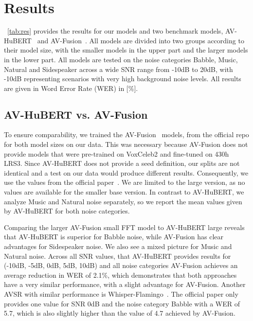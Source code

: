 \section{Results}



\tablename~\ref{tab:res} provides the results for our models and two benchmark models, AV-HuBERT~\cite{AVSR_robust_ssAVSR_avhubert2_2022} and AV-Fusion~\cite{AVSR_2023_selfsupervised}. All models are divided into two groups according to their model size, with the smaller models in the upper part and the larger models in the lower part. All models are tested on the noise categories Babble, Music, Natural and Sidespeaker across a wide SNR range from -10dB to 20dB, with -10dB representing scenarios with very high background noise levels.
All results are given in Word Error Rate (WER) in [\%].

\subsection{AV-HuBERT vs. AV-Fusion}

To ensure comparability, we trained the AV-Fusion~\cite{AVSR_2023_selfsupervised} models, from the official repo for both model sizes on our data. This was necessary because AV-Fusion does not provide models that were pre-trained on VoxCeleb2 and fine-tuned on 430h LRS3. 
Since AV-HuBERT does not provide a seed definition, our splits are not identical and a test on our data would produce different results.
Consequently, we use the values from the official paper~\cite{AVSR_robust_ssAVSR_avhubert2_2022}. We are limited to the large version, as no values are available for the smaller base version. In contrast to AV-HuBERT, we analyze Music and Natural noise separately, so we report the mean values given by AV-HuBERT for both noise categories.

Comparing the larger AV-Fusion small FFT model to AV-HuBERT large reveals that AV-HuBERT is superior for Babble noise, while AV-Fusion has clear advantages for Sidespeaker noise. We also see a mixed picture for Music and Natural noise. 
Across all SNR values, that AV-HuBERT provides results for (-10dB, -5dB, 0dB, 5dB, 10dB) and all noise categories AV-Fusion achieves an average reduction in WER of 2.1\%, which demonstrates that both approaches have a very similar performance, with a slight advantage for AV-Fusion.
Another AVSR with similar performance is Whisper-Flamingo~\cite{AVSR_2024__WhisperFlamingo}. The official paper only provides one value for SNR 0dB and the noise category Babble with a WER of 5.7, which is also slightly higher than the value of 4.7 achieved by AV-Fusion.

